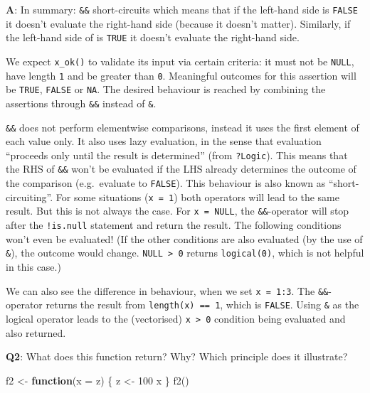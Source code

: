 \documentclass[
]{krantz}
\makeatletter
\newenvironment{Shaded}{\begin{snugshade}}{\end{snugshade}}
\newcommand{\ControlFlowTok}[1]{\textcolor[rgb]{0.13,0.29,0.53}{\textbf{#1}}}
\newcommand{\DataTypeTok}[1]{\textcolor[rgb]{0.13,0.29,0.53}{#1}}
\newcommand{\DecValTok}[1]{\textcolor[rgb]{0.00,0.00,0.81}{#1}}
\newcommand{\KeywordTok}[1]{\textcolor[rgb]{0.13,0.29,0.53}{\textbf{#1}}}
\newcommand{\NormalTok}[1]{#1}
\newcommand{\StringTok}[1]{\textcolor[rgb]{0.31,0.60,0.02}{#1}}
\newenvironment{kframe}{%
\medskip{}
\setlength{\fboxsep}{.8em}
 \def\at@end@of@kframe{}%
 \ifinner\ifhmode%
  \def\at@end@of@kframe{\end{minipage}}%
  \begin{minipage}{\columnwidth}%
 \fi\fi%
 \def\FrameCommand##1{\hskip\@totalleftmargin \hskip-\fboxsep
 \colorbox{shadecolor}{##1}\hskip-\fboxsep
     \hskip-\linewidth \hskip-\@totalleftmargin \hskip\columnwidth}%
 \MakeFramed {\advance\hsize-\width
   \@totalleftmargin\z@ \linewidth\hsize
   \@setminipage}}%
 {\par\unskip\endMakeFramed%
 \at@end@of@kframe}
\renewenvironment{Shaded}{\begin{kframe}}{\end{kframe}}
\renewcommand{\KeywordTok} [1]{\textcolor[rgb]{0.00,0.44,0.13}{{#1}}}
\renewcommand{\DataTypeTok}[1]{\textcolor[rgb]{0.56,0.13,0.00}{{#1}}}
\renewcommand{\DecValTok}  [1]{\textcolor[rgb]{0.25,0.63,0.44}{{#1}}}
\renewcommand{\StringTok}  [1]{\textcolor[rgb]{0.25,0.44,0.63}{{#1}}}
\renewcommand{\NormalTok}  [1]{{#1}}
\makeatother
\begin{document}
\textbf{{A}}: In summary: \texttt{\&\&} short-circuits which means that if the left-hand side is \texttt{FALSE} it doesn't evaluate the right-hand side (because it doesn't matter). Similarly, if the left-hand side of \texttt{\textbar{}\textbar{}} is \texttt{TRUE} it doesn't evaluate the right-hand side.

We expect \texttt{x\_ok()} to validate its input via certain criteria: it must not be \texttt{NULL}, have length \texttt{1} and be greater than \texttt{0}. Meaningful outcomes for this assertion will be \texttt{TRUE}, \texttt{FALSE} or \texttt{NA}. The desired behaviour is reached by combining the assertions through \texttt{\&\&} instead of \texttt{\&}.

\texttt{\&\&} does not perform elementwise comparisons, instead it uses the first element of each value only. It also uses lazy evaluation, in the sense that evaluation ``proceeds only until the result is determined'' (from \texttt{?Logic}). This means that the RHS of \texttt{\&\&} won't be evaluated if the LHS already determines the outcome of the comparison (e.g.~evaluate to \texttt{FALSE}). This behaviour is also known as ``short-circuiting''.
For some situations (\texttt{x\ =\ 1}) both operators will lead to the same result. But this is not always the case. For \texttt{x\ =\ NULL}, the \texttt{\&\&}-operator will stop after the \texttt{!is.null} statement and return the result. The following conditions won't even be evaluated! (If the other conditions are also evaluated (by the use of \texttt{\&}), the outcome would change. \texttt{NULL\ \textgreater{}\ 0} returns \texttt{logical(0)}, which is not helpful in this case.)

We can also see the difference in behaviour, when we set \texttt{x\ =\ 1:3}. The \texttt{\&\&}-operator returns the result from \texttt{length(x)\ ==\ 1}, which is \texttt{FALSE}. Using \texttt{\&} as the logical operator leads to the (vectorised) \texttt{x\ \textgreater{}\ 0} condition being evaluated and also returned.

\textbf{{Q2}}: What does this function return? Why? Which principle does it illustrate?

\begin{Shaded}
\begin{Highlighting}[]
\NormalTok{f2 <-}\StringTok{ }\ControlFlowTok{function}\NormalTok{(}\DataTypeTok{x =}\NormalTok{ z) \{}
\NormalTok{  z <-}\StringTok{ }\DecValTok{100}
\NormalTok{  x}
\NormalTok{\}}
\KeywordTok{f2}\NormalTok{()}
\end{Highlighting}
\end{Shaded}
\end{document}
